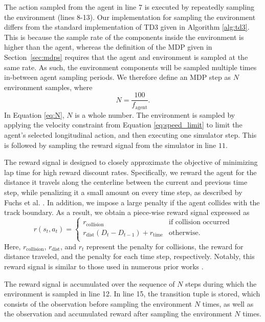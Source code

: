 The action sampled from the agent in line 7 is executed by repeatedly sampling the environment (lines 8-13).
Our implementation for sampling the environment differs from the standard implementation of TD3 given in Algorithm \ref{alg:td3}.
This is because the sample rate of the components inside the environment is higher than the agent, whereas the definition of the MDP given in Section~\ref{sec:mdps} requires that the agent and environment is sampled at the same rate.
As such, the environment components will be sampled multiple times in-between agent sampling periods.
We therefore define an MDP step as $N$ environment samples, where
\begin{equation}
N = \frac{100}{f_{\text{agent}}}.
\label{eq:N}
\end{equation}
In Equation \ref{eq:N}, $N$ is a whole number.
The environment is sampled by applying the velocity constraint from Equation \ref{eq:speed_limit} to limit the agent's selected longitudinal action, and then executing one simulator step.
This is followed by sampling the reward signal from the simulator in line $11$.

The reward signal is designed to closely approximate the objective of minimizing lap time for high reward discount rates.
Specifically, we reward the agent for the distance it travels along the centerline between the current and previous time step, while penalizing it a small amount on every time step, as described by Fuchs et al. \cite{Fuchs2021}. 
In addition, we impose a large penalty if the agent collides with the track boundary. 
As a result, we obtain a piece-wise reward signal expressed as
\begin{dmath}
r(s_t,a_t) = 
\begin{cases}
r_{\text{collision}} & \mbox{if collision occurred} \\
r_{\text{dist}}(D_{t} - D_{t-1}) + r_{\text{time}} & \mbox{otherwise.} \\
\end{cases}
\label{eq:reward_signal}
\end{dmath}
Here, $r_{\text{collision}}$, $r_{\text{dist}}$, and $r_{t}$ represent the penalty for collisions, the reward for distance traveled, and the penalty for each time step, respectively. 
Notably, this reward signal is similar to those used in numerous prior works \cite{Song2021, Ivanov2020, Perot2017}.

The reward signal is accumulated over the sequence of $N$ steps during which the environment is sampled in line 12.
In line 15, the transition tuple is stored, which consists of the observation before sampling the environment $N$ times, as well as the observation and accumulated reward after sampling the environment $N$ times.

